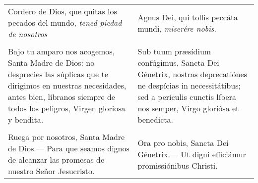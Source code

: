 \documentclass[./rosary.tex]{subfiles}
\begin{document}
\begin{longtable} { p{} p{} }
    Cordero de Dios, que quitas los pecados del mundo, \emph{tened piedad de nosotros}                                       &
    Agnus Dei, qui tollis peccáta mundi, \emph{miserére nobis}.                                                                                                             \\\\
    Bajo tu amparo nos acogemos, Santa Madre de Dios: no desprecies las súplicas que te dirigimos en nuestras necesidades,
    antes bien, líbranos siempre de todos los peligros, Virgen gloriosa y bendita.                                           &
    Sub tuum præsídium confúgimus, Sancta Dei Génetrix, nostras de­pre­ca­tiónes ne despícias in ne­ces­si­tátibus;
    sed a perículis cunctis líbera nos semper, Virgo gloriósa et benedícta.                                                                                                 \\\\
    Ruega por nosotros, Santa Madre de Dios.--- Para que seamos dignos de alcanzar las promesas de nuestro Señor Jesucristo. &
    Ora pro nobis, Sancta Dei Génetrix.--- Ut digni efficiámur pro­mi­ssiónibus Christi.
\end{longtable}
\end{document}

